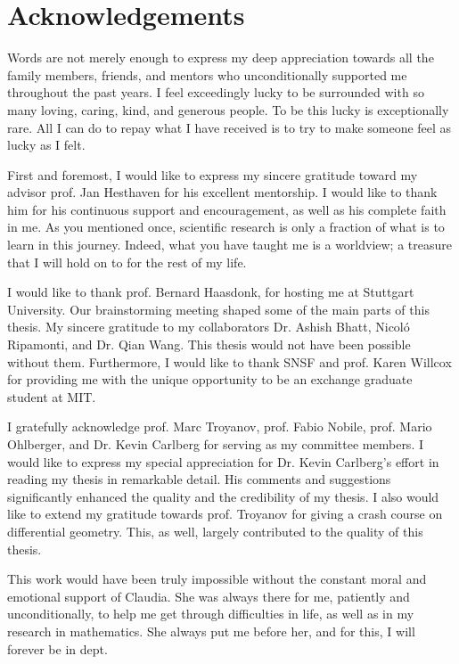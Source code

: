 \chapter*{Acknowledgements}
Words are not merely enough to express my deep appreciation towards all the family members, friends, and mentors who unconditionally supported me throughout the past years. I feel exceedingly lucky to be surrounded with so many loving, caring, kind, and generous people. To be this lucky is exceptionally rare. All I can do to repay what I have received is to try to make someone feel as lucky as I felt.


First and foremost, I would like to express my sincere gratitude toward my advisor prof. Jan Hesthaven for his excellent mentorship. I would like to thank him for his continuous support and encouragement, as well as his complete faith in me. As you mentioned once, scientific research is only a fraction of what is to learn in this journey. Indeed, what you have taught me is a worldview; a treasure that I will hold on to for the rest of my life.

I would like to thank prof. Bernard Haasdonk, for hosting me at Stuttgart University. Our brainstorming meeting shaped some of the main parts of this thesis. My sincere gratitude to my collaborators Dr. Ashish Bhatt, Nicol\'o Ripamonti, and Dr. Qian Wang. This thesis would not have been possible without them. Furthermore, I would like to thank SNSF and prof. Karen Willcox for providing me with the unique opportunity to be an exchange graduate student at MIT.



I gratefully acknowledge prof. Marc Troyanov, prof. Fabio Nobile, prof. Mario Ohlberger, and Dr. Kevin Carlberg for serving as my committee members. I would like to express my special appreciation for Dr. Kevin Carlberg's effort in reading my thesis in remarkable detail. His comments and suggestions significantly enhanced the quality and the credibility of my thesis. I also would like to extend my gratitude towards prof. Troyanov for giving a crash course on differential geometry. This, as well, largely contributed to the quality of this thesis. 


This work would have been truly impossible without the constant moral and emotional support of Claudia. She was always there for me, patiently and unconditionally, to help me get through difficulties in life, as well as in my research in mathematics. She always put me before her, and for this, I will forever be in dept.


